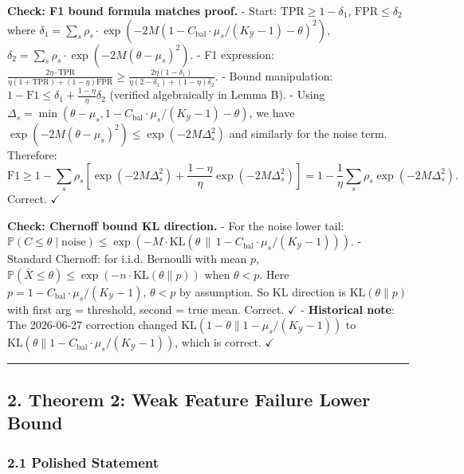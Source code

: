 \documentclass[
  12pt,
]{ctexart}
\begin{document}
\textbf{Check: F1 bound formula matches proof.} - Start:
\(\text{TPR} \geq 1 - \delta_1\), \(\text{FPR} \leq \delta_2\) where
\(\delta_1 = \sum_s \rho_s \cdot \exp(-2M(1 - C_{\text{bal}}\cdot\mu_s/(K_{\mathcal{Y}}-1) - \theta)^2)\),
\(\delta_2 = \sum_s \rho_s \cdot \exp(-2M(\theta - \mu_s)^2)\). - F1
expression:
\(\frac{2\eta \cdot \text{TPR}}{\eta(1+\text{TPR}) + (1-\eta)\text{FPR}} \geq \frac{2\eta(1-\delta_1)}{\eta(2-\delta_1) + (1-\eta)\delta_2}\).
- Bound manipulation:
\(1 - \text{F1} \leq \delta_1 + \frac{1-\eta}{\eta}\delta_2\) (verified
algebraically in Lemma B). - Using
\(\Delta_s = \min(\theta - \mu_s, 1 - C_{\text{bal}}\cdot\mu_s/(K_{\mathcal{Y}}-1) - \theta)\),
we have \(\exp(-2M(\theta - \mu_s)^2) \leq \exp(-2M\Delta_s^2)\) and
similarly for the noise term. Therefore:
\[\text{F1} \geq 1 - \sum_s \rho_s[\exp(-2M\Delta_s^2) + \frac{1-\eta}{\eta}\exp(-2M\Delta_s^2)] = 1 - \frac{1}{\eta}\sum_s \rho_s \exp(-2M\Delta_s^2).\]
Correct. \(\checkmark\)

\textbf{Check: Chernoff bound KL direction.} - For the noise lower tail:
\(\mathbb{P}(C \leq \theta \mid \text{noise}) \leq \exp(-M \cdot \text{KL}(\theta \,\|\, 1 - C_{\text{bal}}\cdot\mu_s/(K_{\mathcal{Y}}-1)))\).
- Standard Chernoff: for i.i.d. Bernoulli with mean \(p\),
\(\mathbb{P}(\bar{X} \leq \theta) \leq \exp(-n \cdot \text{KL}(\theta \| p))\)
when \(\theta < p\). Here
\(p = 1 - C_{\text{bal}}\cdot\mu_s/(K_{\mathcal{Y}}-1)\), \(\theta < p\)
by assumption. So KL direction is \(\text{KL}(\theta \| p)\) with first
arg = threshold, second = true mean. Correct. \(\checkmark\) -
\textbf{Historical note}: The 2026-06-27 correction changed
\(\text{KL}(1-\theta \| 1 - \mu_s/(K_{\mathcal{Y}}-1))\) to
\(\text{KL}(\theta \| 1 - C_{\text{bal}}\cdot\mu_s/(K_{\mathcal{Y}}-1))\),
which is correct. \(\checkmark\)

\begin{center}\rule{0.5\linewidth}{0.5pt}\end{center}

\subsection{2. Theorem 2: Weak Feature Failure Lower
Bound}\label{theorem-2-weak-feature-failure-lower-bound}

\subsubsection{2.1 Polished Statement}\label{polished-statement-1}
\end{document}

